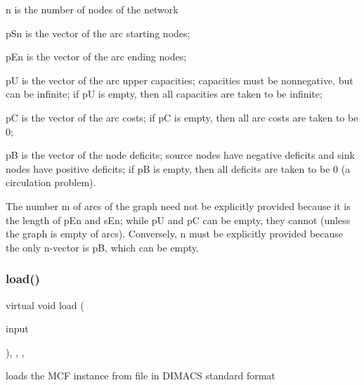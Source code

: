 \begin{DoxyItemize}
\item n is the number of nodes of the network
\item p\+Sn is the vector of the arc starting nodes;
\item p\+En is the vector of the arc ending nodes;
\item pU is the vector of the arc upper capacities; capacities must be nonnegative, but can be infinite; if pU is empty, then all capacities are taken to be infinite;
\item pC is the vector of the arc costs; if pC is empty, then all arc costs are taken to be 0;
\item pB is the vector of the node deficits; source nodes have negative deficits and sink nodes have positive deficits; if pB is empty, then all deficits are taken to be 0 (a circulation problem).
\end{DoxyItemize}

The number m of arcs of the graph need not be explicitly provided because it is the length of p\+En and s\+En; while pU and pC can be empty, they cannot (unless the graph is empty of arcs). Conversely, n must be explicitly provided because the only n-\/vector is pB, which can be empty. \mbox{\label{class_s_m_spp__di__unipi__it_1_1_m_c_f_block_a221601b23896f7a98c6914f42224d446}} 
\subsubsection{\texorpdfstring{load()}{load()}\hspace{0.1cm}{\footnotesize\ttfamily [2/2]}}
{\footnotesize\ttfamily virtual void load (\begin{DoxyParamCaption}\item[{std\+::istream \&}]{input }\end{DoxyParamCaption})\hspace{0.3cm}{\ttfamily [final]}, {\ttfamily [override]}, {\ttfamily [protected]}, {\ttfamily [virtual]}}



loads the M\+CF instance from file in D\+I\+M\+A\+CS standard format 

